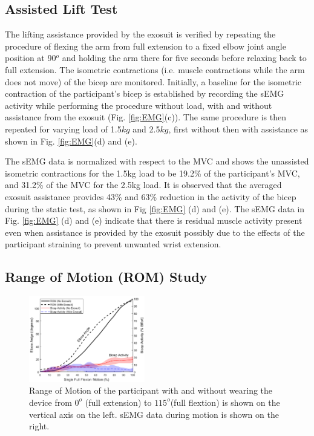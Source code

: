 \documentclass[letterpaper, 10 pt, conference]{ieeeconf}  %
\begin{document}
\subsection{Assisted Lift Test}
The lifting assistance provided by the exosuit is verified by repeating the procedure of flexing the arm from full extension to a fixed elbow joint angle position at 90$^o$ and holding the arm there for five seconds before relaxing back to full extension. The isometric contractions (i.e. muscle contractions while the arm does not move) of the bicep are monitored.  Initially, a baseline for the isometric contraction of the participant's bicep is established by recording the sEMG activity while performing the procedure without load, with and without assistance from the exosuit (Fig. \ref{fig:EMG}(c)). The same procedure is then repeated for varying load of 1.5$kg$ and 2.5$kg$, first without then with assistance as shown in Fig. \ref{fig:EMG}(d) and (e).  

The sEMG data is normalized with respect to the MVC and shows the unassisted isometric contractions for the 1.5kg load to be 19.2\% of the participant's MVC, and 31.2\% of the MVC for the 2.5kg load. It is observed that the averaged exosuit assistance provides 43\% and 63\% reduction in the activity of the bicep during the static test, as shown in Fig \ref{fig:EMG} (d) and (e). The sEMG data in Fig. \ref{fig:EMG} (d) and (e) indicate that there is residual muscle activity present even when assistance is provided by the exosuit possibly due to the effects of the participant straining to prevent unwanted wrist extension.

\subsection{Range of Motion (ROM) Study}

\begin{figure}[t!]
\centering
\includegraphics[width=0.45\textwidth]{ROM.PNG}
\caption{Range of Motion of the participant with and without wearing the device from  $0^o$  (full extension) to $115^o$(full flextion) is shown on the vertical axis on the left.  sEMG data during motion is shown on the right. 
}
\label{fig:ROM}
\vspace{-1.5em}
\end{figure}
\end{document}
